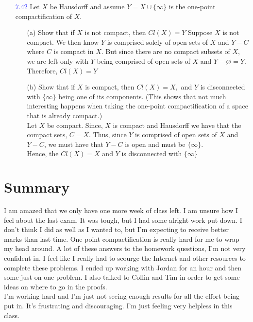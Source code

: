 \documentclass[12pt]{article}
\newcommand{\ak}[1]{\textcolor{blue}{#1}}
\begin{document}
\begin{enumerate}
		\item[\ak{7.42}] Let $X$ be Hausdorff and assume $Y = X \cup \{ \infty \}$ is the one-point compactification of $X .$
		\begin{enumerate}
			\item[(a)] Show that if $X$ is not compact, then $C l ( X ) = Y$
			Suppose $ X $ is not compact. We then know $ Y $ is comprised solely of open sets of $ X $ and $ Y-C $ where $ C $ is compact in $ X $. But since there are no compact subsets of $ X $, we are left only with $ Y $ being comprised of open sets of $ X $ and $ Y-\varnothing = Y$. \\
			Therefore, $ Cl(X)=Y $
				\item[(b)] Show that if $X$ is compact, then $C l ( X ) = X ,$ and $Y$ is disconnected with
			$\{ \infty \}$ being one of its components. (This shows that not much interesting
			happens when taking the one-point compactification of a space that is
			already compact.)\\
			Let $ X $ be compact.  Since, $ X $ is compact and Hausdorff we have that the compact sets, $ C = X $. Thus, since $ Y $ is comprised of open sets of $ X $ and $ Y-C $, we must have that $ Y-C $ is open and must be $ \{\infty\} $. \\
			Hence, the $ Cl(X)=X $ and $ Y $ is disconnected with $ \{\infty\} $
		\end{enumerate}
	\end{enumerate}
	\section*{Summary}
	I am amazed that we only have one more week of class left. I am unsure how I feel about the last exam. It was tough, but I had some alright work put down. I don't think I did as well as I wanted to, but I'm expecting to receive better marks than last time. One point compactification is really hard for me to wrap my head around. A lot of these answers to the homework questions, I'm not very confident in. I feel like I really had to scourge the Internet and other resources to complete these problems. I ended up working with Jordan for an hour and then some just on one problem. I also talked to Collin and Tim in order to get some ideas on where to go in the proofs.\\  I'm working hard and I'm just not seeing enough results for all the effort being put in. It's frustrating and discouraging. I'm just feeling very helpless in this class.
\end{document}
